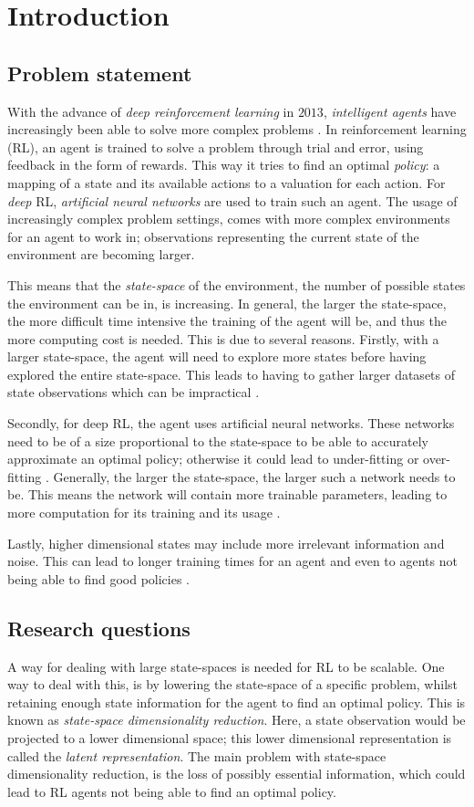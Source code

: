 \chapter{Introduction}\label{introduction}
\section{Problem statement}
With the advance of \emph{deep reinforcement learning} in $2013$, \emph{intelligent agents} have increasingly been able to solve more complex problems \cite{deeprl}. In reinforcement learning (RL), an agent is trained to solve a problem through trial and error, using feedback in the form of rewards. This way it tries to find an optimal \emph{policy}: a mapping of a state and its available actions to a valuation for each action. For \emph{deep} RL, \emph{artificial neural networks} are used to train such an agent. The usage of increasingly complex problem settings, comes with more complex environments for an agent to work in; observations representing the current state of the environment are becoming larger.

This means that the \emph{state-space} of the environment, the number of possible states the environment can be in, is increasing. In general, the larger the state-space, the more difficult time intensive the training of the agent will be, and thus the more computing cost is needed. This is due to several reasons. Firstly, with a larger state-space, the agent will need to explore more states before having explored the entire state-space. This leads to having to gather larger datasets of state observations which can be impractical \cite{AE_2019}.

Secondly, for deep RL, the agent uses artificial neural networks. These networks need to be of a size proportional to the state-space to be able to accurately approximate an optimal policy; otherwise it could lead to under-fitting or over-fitting \cite{rlfitting}. Generally, the larger the state-space, the larger such a network needs to be. This means the network will contain more trainable parameters, leading to more computation for its training and its usage \cite{AE_2019}.

Lastly, higher dimensional states may include more irrelevant information and noise. This can lead to longer training times for an agent and even to agents not being able to find good policies \cite{AE_2016}.

\section{Research questions}
A way for dealing with large state-spaces is needed for RL to be scalable. One way to deal with this, is by lowering the state-space of a specific problem, whilst retaining enough state information for the agent to find an optimal policy. This is known as \emph{state-space dimensionality reduction}. Here, a state observation would be projected to a lower dimensional space; this lower dimensional representation is called the \emph{latent representation}. The main problem with state-space dimensionality reduction, is the loss of possibly essential information, which could lead to RL agents not being able to find an optimal policy. 

